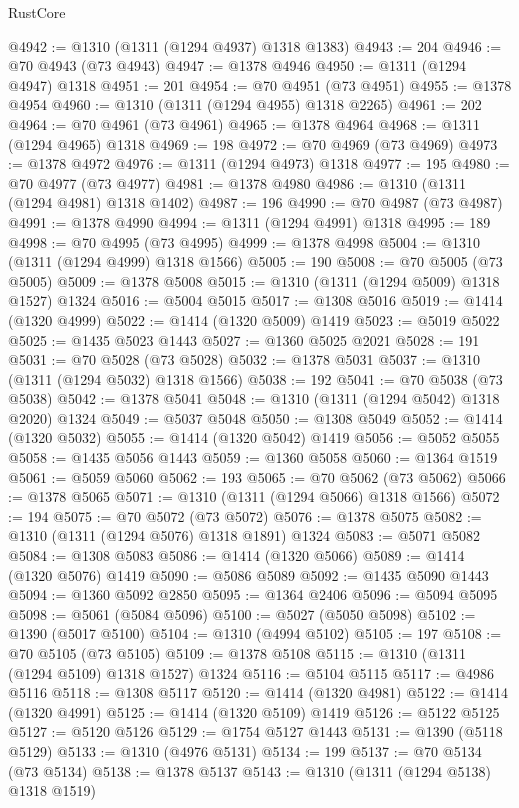 \begin{lexlean}{RustCore}
\begin{coremodule}
@4942 := @1310 (@1311 (@1294 @4937) @1318 @1383)
@4943 := 204
@4946 := @70 @4943 (@73 @4943)
@4947 := @1378 @4946
@4950 := @1311 (@1294 @4947) @1318
@4951 := 201
@4954 := @70 @4951 (@73 @4951)
@4955 := @1378 @4954
@4960 := @1310 (@1311 (@1294 @4955) @1318 @2265)
@4961 := 202
@4964 := @70 @4961 (@73 @4961)
@4965 := @1378 @4964
@4968 := @1311 (@1294 @4965) @1318
@4969 := 198
@4972 := @70 @4969 (@73 @4969)
@4973 := @1378 @4972
@4976 := @1311 (@1294 @4973) @1318
@4977 := 195
@4980 := @70 @4977 (@73 @4977)
@4981 := @1378 @4980
@4986 := @1310 (@1311 (@1294 @4981) @1318 @1402)
@4987 := 196
@4990 := @70 @4987 (@73 @4987)
@4991 := @1378 @4990
@4994 := @1311 (@1294 @4991) @1318
@4995 := 189
@4998 := @70 @4995 (@73 @4995)
@4999 := @1378 @4998
@5004 := @1310 (@1311 (@1294 @4999) @1318 @1566)
@5005 := 190
@5008 := @70 @5005 (@73 @5005)
@5009 := @1378 @5008
@5015 := @1310 (@1311 (@1294 @5009) @1318 @1527) @1324
@5016 := @5004 @5015
@5017 := @1308 @5016
@5019 := @1414 (@1320 @4999)
@5022 := @1414 (@1320 @5009) @1419
@5023 := @5019 @5022
@5025 := @1435 @5023 @1443
@5027 := @1360 @5025 @2021
@5028 := 191
@5031 := @70 @5028 (@73 @5028)
@5032 := @1378 @5031
@5037 := @1310 (@1311 (@1294 @5032) @1318 @1566)
@5038 := 192
@5041 := @70 @5038 (@73 @5038)
@5042 := @1378 @5041
@5048 := @1310 (@1311 (@1294 @5042) @1318 @2020) @1324
@5049 := @5037 @5048
@5050 := @1308 @5049
@5052 := @1414 (@1320 @5032)
@5055 := @1414 (@1320 @5042) @1419
@5056 := @5052 @5055
@5058 := @1435 @5056 @1443
@5059 := @1360 @5058
@5060 := @1364 @1519
@5061 := @5059 @5060
@5062 := 193
@5065 := @70 @5062 (@73 @5062)
@5066 := @1378 @5065
@5071 := @1310 (@1311 (@1294 @5066) @1318 @1566)
@5072 := 194
@5075 := @70 @5072 (@73 @5072)
@5076 := @1378 @5075
@5082 := @1310 (@1311 (@1294 @5076) @1318 @1891) @1324
@5083 := @5071 @5082
@5084 := @1308 @5083
@5086 := @1414 (@1320 @5066)
@5089 := @1414 (@1320 @5076) @1419
@5090 := @5086 @5089
@5092 := @1435 @5090 @1443
@5094 := @1360 @5092 @2850
@5095 := @1364 @2406
@5096 := @5094 @5095
@5098 := @5061 (@5084 @5096)
@5100 := @5027 (@5050 @5098)
@5102 := @1390 (@5017 @5100)
@5104 := @1310 (@4994 @5102)
@5105 := 197
@5108 := @70 @5105 (@73 @5105)
@5109 := @1378 @5108
@5115 := @1310 (@1311 (@1294 @5109) @1318 @1527) @1324
@5116 := @5104 @5115
@5117 := @4986 @5116
@5118 := @1308 @5117
@5120 := @1414 (@1320 @4981)
@5122 := @1414 (@1320 @4991)
@5125 := @1414 (@1320 @5109) @1419
@5126 := @5122 @5125
@5127 := @5120 @5126
@5129 := @1754 @5127 @1443
@5131 := @1390 (@5118 @5129)
@5133 := @1310 (@4976 @5131)
@5134 := 199
@5137 := @70 @5134 (@73 @5134)
@5138 := @1378 @5137
@5143 := @1310 (@1311 (@1294 @5138) @1318 @1519)

\end{coremodule}
\end{lexlean}
